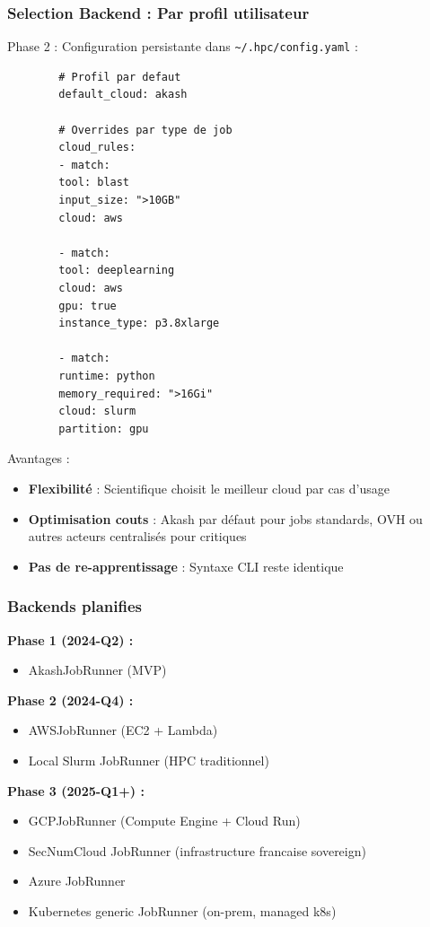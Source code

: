 \documentclass[11pt,a4paper]{article}
\begin{document}
	\subsubsection{Selection Backend : Par profil utilisateur}
	
	Phase 2 : Configuration persistante dans \texttt{\textasciitilde/.hpc/config.yaml} :
	
	\begin{lstlisting}
		# Profil par defaut
		default_cloud: akash
		
		# Overrides par type de job
		cloud_rules:
		- match:
		tool: blast
		input_size: ">10GB"
		cloud: aws
		
		- match:
		tool: deeplearning
		cloud: aws
		gpu: true
		instance_type: p3.8xlarge
		
		- match:
		runtime: python
		memory_required: ">16Gi"
		cloud: slurm
		partition: gpu
	\end{lstlisting}
	
	Avantages :
	\begin{itemize}
		\item \textbf{Flexibilité} : Scientifique choisit le meilleur cloud par cas d'usage
		\item \textbf{Optimisation couts} : Akash par défaut pour jobs standards, OVH ou autres acteurs centralisés pour critiques
		\item \textbf{Pas de re-apprentissage} : Syntaxe CLI reste identique
	\end{itemize}
	
	\subsubsection{Backends planifies}
	
	\textbf{Phase 1 (2024-Q2) :}
	\begin{itemize}
		\item AkashJobRunner (MVP)
	\end{itemize}
	
	\textbf{Phase 2 (2024-Q4) :}
	\begin{itemize}
		\item AWSJobRunner (EC2 + Lambda)
		\item Local Slurm JobRunner (HPC traditionnel)
	\end{itemize}
	
	\textbf{Phase 3 (2025-Q1+) :}
	\begin{itemize}
		\item GCPJobRunner (Compute Engine + Cloud Run)
		\item SecNumCloud JobRunner (infrastructure francaise sovereign)
		\item Azure JobRunner
		\item Kubernetes generic JobRunner (on-prem, managed k8s)
	\end{itemize}
	
\end{document}
